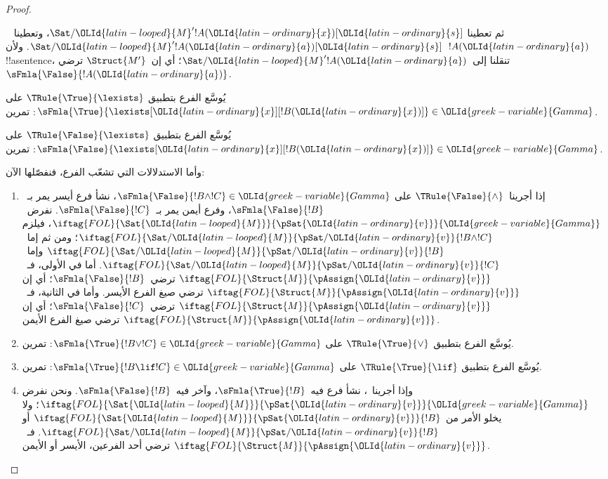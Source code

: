 \documentclass[../../../include/open-logic-section]{subfiles}
\begin{document}
\begin{proof}
\begin{enumerate}
{  ثم تعطينا 
  $\Sat/{{\OLId{latin-looped}{M}}'}{!A({\OLId{latin-ordinary}{x}})}[{\OLId{latin-ordinary}{s}}]$، وتعطينا
  ~$\Sat/{{\OLId{latin-looped}{M}}'}{!A({\OLId{latin-ordinary}{a}})}[{\OLId{latin-ordinary}{s}}]$.
  ولأن~$!A({\OLId{latin-ordinary}{a}})$ !!a{sentence}، تنقلنا
   إلى~$\Sat/{{\OLId{latin-looped}{M}}'}{!A({\OLId{latin-ordinary}{a}})}$؛
  أي إن~$\Struct{M'}$ ترضي~$\sFmla{\False}{!A({\OLId{latin-ordinary}{a}})}$.
\item يُوسَّع الفرع بتطبيق $\TRule{\True}{\lexists}$ على
  $\sFmla{\True}{\lexists[{\OLId{latin-ordinary}{x}}][!B({\OLId{latin-ordinary}{x}})]} \in {\OLId{greek-variable}{Gamma}}$: تمرين.
\item يُوسَّع الفرع بتطبيق $\TRule{\False}{\lexists}$ على
  $\sFmla{\False}{\lexists[{\OLId{latin-ordinary}{x}}][!B({\OLId{latin-ordinary}{x}})]} \in {\OLId{greek-variable}{Gamma}}$: تمرين.}{}
\end{enumerate}
وأما الاستدلالات التي تشعّب الفرع، فنفصّلها الآن:
\begin{enumerate}
\item إذا أجرينا~$\TRule{\False}{\land}$ على
  $\sFmla{\False}{!B \land !C} \in {\OLId{greek-variable}{Gamma}}$،
  نشأ فرع أيسر يمر بـ~$\sFmla{\False}{!B}$،
  وفرع أيمن يمر بـ~$\sFmla{\False}{!C}$.
  نفرض~$\iftag{FOL}{\Sat{{\OLId{latin-looped}{M}}}}{\pSat{{\OLId{latin-ordinary}{v}}}}{{\OLId{greek-variable}{Gamma}}}$، فيلزم
  $\iftag{FOL}{\Sat/{{\OLId{latin-looped}{M}}}}{\pSat/{{\OLId{latin-ordinary}{v}}}}{!B \land !C}$؛
  ومن ثم إما~$\iftag{FOL}{\Sat/{{\OLId{latin-looped}{M}}}}{\pSat/{{\OLId{latin-ordinary}{v}}}}{!B}$
  وإما~$\iftag{FOL}{\Sat/{{\OLId{latin-looped}{M}}}}{\pSat/{{\OLId{latin-ordinary}{v}}}}{!C}$.
  أما في الأولى، فـ~$\iftag{FOL}{\Struct{M}}{\pAssign{{\OLId{latin-ordinary}{v}}}}$
  ترضي~$\sFmla{\False}{!B}$؛ أي إن
  $\iftag{FOL}{\Struct{M}}{\pAssign{{\OLId{latin-ordinary}{v}}}}$ ترضي صيغ الفرع الأيسر.
  وأما في الثانية، فـ~$\iftag{FOL}{\Struct{M}}{\pAssign{{\OLId{latin-ordinary}{v}}}}$
  ترضي~$\sFmla{\False}{!C}$؛ أي إن
  $\iftag{FOL}{\Struct{M}}{\pAssign{{\OLId{latin-ordinary}{v}}}}$ ترضي صيغ الفرع الأيمن.
\item يُوسَّع الفرع بتطبيق $\TRule{\True}{\lor}$ على
  $\sFmla{\True}{!B \lor !C} \in {\OLId{greek-variable}{Gamma}}$: تمرين.
\item يُوسَّع الفرع بتطبيق $\TRule{\True}{\lif}$ على
  $\sFmla{\True}{!B \lif !C} \in {\OLId{greek-variable}{Gamma}}$: تمرين.
\item وإذا أجرينا~\Cut، نشأ فرع فيه~$\sFmla{\True}{!B}$،
  وآخر فيه~$\sFmla{\False}{!B}$. ونحن نفرض
  $\iftag{FOL}{\Sat{{\OLId{latin-looped}{M}}}}{\pSat{{\OLId{latin-ordinary}{v}}}}{{\OLId{greek-variable}{Gamma}}}$؛ ولا يخلو الأمر من
  $\iftag{FOL}{\Sat{{\OLId{latin-looped}{M}}}}{\pSat{{\OLId{latin-ordinary}{v}}}}{!B}$ أو
  $\iftag{FOL}{\Sat/{{\OLId{latin-looped}{M}}}}{\pSat/{{\OLId{latin-ordinary}{v}}}}{!B}$.
  فـ~$\iftag{FOL}{\Struct{M}}{\pAssign{{\OLId{latin-ordinary}{v}}}}$ ترضي أحد الفرعين،
  الأيسر أو الأيمن.
\end{enumerate}
\end{proof}
\end{document}
